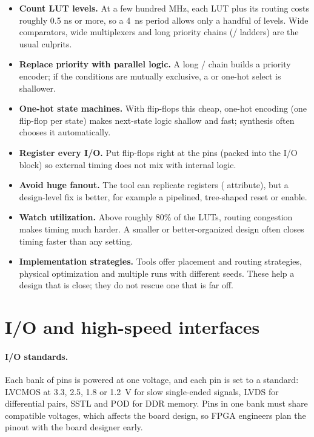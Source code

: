 \begin{itemize}
  \item \textbf{Count LUT levels.} At a few hundred MHz, each LUT plus its routing costs roughly 0.5 ns or more, so a 4~ns period allows only a handful of levels. Wide comparators, wide multiplexers and long priority chains (/ ladders) are the usual culprits.
  \item \textbf{Replace priority with parallel logic.} A long / chain builds a priority encoder; if the conditions are mutually exclusive, a  or one-hot select is shallower.
  \item \textbf{One-hot state machines.} With flip-flops this cheap, one-hot encoding (one flip-flop per state) makes next-state logic shallow and fast; synthesis often chooses it automatically.
  \item \textbf{Register every I/O.} Put flip-flops right at the pins (packed into the I/O block) so external timing does not mix with internal logic.
  \item \textbf{Avoid huge fanout.} The tool can replicate registers ( attribute), but a design-level fix is better, for example a pipelined, tree-shaped reset or enable.
  \item \textbf{Watch utilization.} Above roughly 80\% of the LUTs, routing congestion makes timing much harder. A smaller or better-organized design often closes timing faster than any setting.
  \item \textbf{Implementation strategies.} Tools offer placement and routing strategies, physical optimization and multiple runs with different seeds. These help a design that is close; they do not rescue one that is far off.
\end{itemize}

\section{I/O and high-speed interfaces}

\paragraph{I/O standards.} Each bank of pins is powered at one voltage, and each pin is set to a standard: LVCMOS at 3.3, 2.5, 1.8 or 1.2~V for slow single-ended signals, LVDS for differential pairs, SSTL and POD for DDR memory. Pins in one bank must share compatible voltages, which affects the board design, so FPGA engineers plan the pinout with the board designer early.

